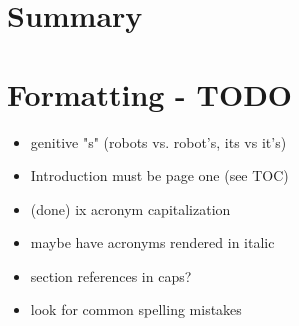 \chapter{Summary}

\chapter{Formatting - TODO}

\begin{itemize}
  \item genitive "s" (robots vs. robot's, its vs it's)
  \item Introduction must be page one (see TOC)
  \item (done) ix acronym capitalization
  \item maybe have acronyms rendered in italic
  \item section references in caps?
  \item look for common spelling mistakes
\end{itemize}
